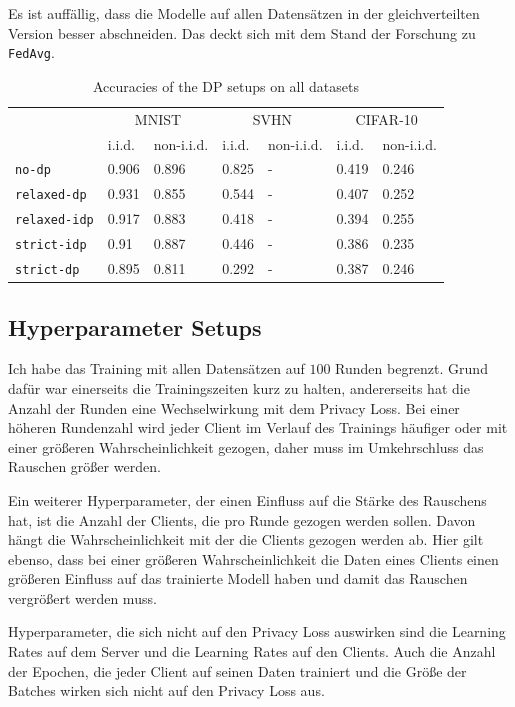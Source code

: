 Es ist auffällig, dass die Modelle auf allen Datensätzen in der gleichverteilten Version besser abschneiden. Das deckt sich mit dem Stand der Forschung zu \texttt{FedAvg}.

\begin{table}
	\centering
	\begin{tabular}{lp{4em}p{4em}p{4em}p{4em}p{4em}p{4em}}
		\toprule 
	 	& \multicolumn{2}{c}{MNIST} & \multicolumn{2}{c}{SVHN} & \multicolumn{2}{c}{CIFAR-10} \\
		\cmidrule(lr){2-3}\cmidrule(lr){4-5}\cmidrule(lr){6-7}
		& i.i.d. & non-i.i.d. & i.i.d. & non-i.i.d. & i.i.d. & non-i.i.d. \\
		\midrule
		\texttt{no-dp} & 0.906 & 0.896 & 0.825 & - & 0.419 & 0.246 \\
		\texttt{relaxed-dp} & 0.931 & 0.855 & 0.544 & - & 0.407 & 0.252 \\
		\texttt{relaxed-idp} & 0.917 & 0.883 & 0.418 & - & 0.394 & 0.255 \\
		\texttt{strict-idp} & 0.91 & 0.887 & 0.446 & - & 0.386 & 0.235 \\
		\texttt{strict-dp} & 0.895 & 0.811 & 0.292 & - & 0.387 & 0.246 \\
		\bottomrule
	\end{tabular}
	\caption{Accuracies of the DP setups on all datasets}
	\label{tab:all-fed-results}
\end{table}

\subsection{Hyperparameter Setups}
Ich habe das Training mit allen Datensätzen auf $100$ Runden begrenzt. Grund dafür war einerseits die Trainingszeiten kurz zu halten, andererseits hat die Anzahl der Runden eine Wechselwirkung mit dem Privacy Loss. Bei einer höheren Rundenzahl wird jeder Client im Verlauf des Trainings häufiger oder mit einer größeren Wahrscheinlichkeit gezogen, daher muss im Umkehrschluss das Rauschen größer werden. 

Ein weiterer Hyperparameter, der einen Einfluss auf die Stärke des Rauschens hat, ist die Anzahl der Clients, die pro Runde gezogen werden sollen. Davon hängt die Wahrscheinlichkeit mit der die Clients gezogen werden ab. Hier gilt ebenso, dass bei einer größeren Wahrscheinlichkeit die Daten eines Clients einen größeren Einfluss auf das trainierte Modell haben und damit das Rauschen vergrößert werden muss.

Hyperparameter, die sich nicht auf den Privacy Loss auswirken sind die Learning Rates auf dem Server und die Learning Rates auf den Clients. Auch die Anzahl der Epochen, die jeder Client auf seinen Daten trainiert und die Größe der Batches wirken sich nicht auf den Privacy Loss aus.

